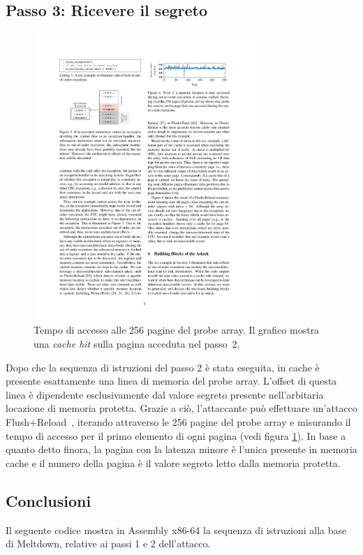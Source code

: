 \subsection{Passo 3: Ricevere il segreto}
\label{sec:meltdown-passo-3}

\begin{figure}
	\centering
	\includegraphics[width=0.75\textwidth]{"img/probe-array.pdf"}
	\caption{Tempo di accesso alle 256 pagine del probe array. Il grafico mostra una \emph{cache hit} sulla pagina acceduta nel passo~2.~\cite{lipp:meltdown}}
	\label{fig:probe-array}
\end{figure}

Dopo che la sequenza di istruzioni del passo 2 è stata eseguita, in cache è presente esattamente una linea di memoria del probe array.
L'offset di questa linea è dipendente esclusivamente dal valore segreto presente nell'arbitaria locazione di memoria protetta.
Grazie a ciò, l'attaccante può effettuare un'attacco Flush+Reload~\cite{yaron:flush-reload}, iterando attraverso le 256 pagine del probe array e misurando il tempo di accesso per il primo elemento di ogni pagina (vedi figura \ref{fig:probe-array}).
In base a quanto detto finora, la pagina con la latenza minore è l'unica presente in memoria cache e il numero della pagina è il valore segreto letto dalla memoria protetta.


\subsection{Conclusioni}
\label{sec:meltdown-conclusioni}
Il seguente codice mostra in Assembly x86-64 la sequenza di istruzioni alla base di Meltdown, relative ai passi 1 e 2 dell'attacco.

